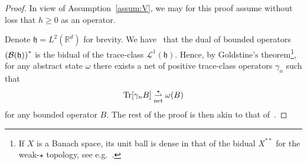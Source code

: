 \documentclass[AHL,Unicode,longabstracts,published]{cedram}
\DeclareMathOperator{\Tr}{Tr}
\newcommand{\cL}{\mathcal{L}}
\newcommand{\R}{\mathbb{R}}
\newcommand{\gh}{\mathfrak{h}}
\newcommand{\cB}{\mathcal{B}}
\newcommand{\1}{\mathds{1}}
\newcommand{\cvnet}{\overset{\star}{\underset{\mathrm{net}}{\rightharpoonup}}}
\let\originalleft\left
\let\originalright\right
\renewcommand{\left}{\mathopen{}\mathclose\bgroup\originalleft}
\renewcommand{\right}{\aftergroup\egroup\originalright}
\begin{document}
\begin{proof}
In view of Assumption~\ref{assum:V}, we may for this proof assume without loss that $h\geq 0$ as an operator.

Denote $\gh = L^2 (\R^d)$ for brevity. We have~\cite[Chapter~4]{Schatten-60} that the dual of bounded operators $\left(\cB (\gh)\right)^*$ is the bidual of the trace-class $\cL^1 (\gh)$. Hence, by Goldstine's theorem\footnote{If $X$ is a Banach space, its unit ball is dense in that of the bidual $X^{**}$ for the weak-$\star$ topology, see e.g.~\cite[Exercise~1 p.~128]{Rudin2}.}, for any abstract state $\omega$ there exists a net of positive trace-class operators $\gamma_n$ such that
\begin{equation}\label{eq:density}
\Tr \left[\gamma_n B \right] \cvnet \omega (B)
\end{equation}
for any bounded operator $B$. The rest of the proof is then akin to that of~\cite[Proposition~2.8]{CorFalOli-20}.


\end{proof}
\end{document}
